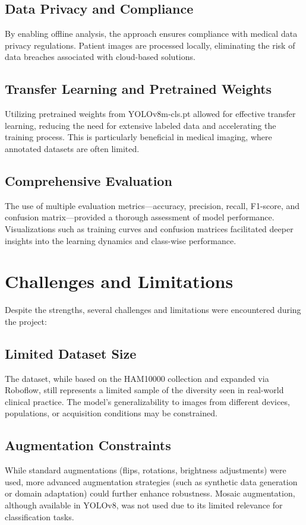 \documentclass[a4paper,12pt]{report}
\begin{document}
\begin{spacing}{1.5}
        \subsection*{Data Privacy and Compliance}
        By enabling offline analysis, the approach ensures compliance with medical data privacy regulations. Patient images are processed locally, eliminating the risk of data breaches associated with cloud-based solutions.
        
        \subsection*{Transfer Learning and Pretrained Weights}
        Utilizing pretrained weights from YOLOv8m-cls.pt allowed for effective transfer learning, reducing the need for extensive labeled data and accelerating the training process. This is particularly beneficial in medical imaging, where annotated datasets are often limited.
        
        \subsection*{Comprehensive Evaluation}
        The use of multiple evaluation metrics—accuracy, precision, recall, F1-score, and confusion matrix—provided a thorough assessment of model performance. Visualizations such as training curves and confusion matrices facilitated deeper insights into the learning dynamics and class-wise performance.

    \newpage

    \section{Challenges and Limitations}
    
    Despite the strengths, several challenges and limitations were encountered during the project:
    
        \subsection*{Limited Dataset Size}
        The dataset, while based on the HAM10000 collection and expanded via Roboflow, still represents a limited sample of the diversity seen in real-world clinical practice. The model’s generalizability to images from different devices, populations, or acquisition conditions may be constrained.
        
        \subsection*{Augmentation Constraints}
        While standard augmentations (flips, rotations, brightness adjustments) were used, more advanced augmentation strategies (such as synthetic data generation or domain adaptation) could further enhance robustness. Mosaic augmentation, although available in YOLOv8, was not used due to its limited relevance for classification tasks.
        

\end{spacing}
\end{document}
